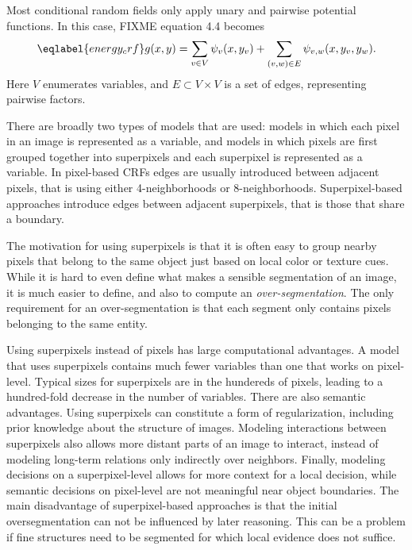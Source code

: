 Most conditional random fields only apply unary and pairwise potential functions. In this case, FIXME equation 4.4
becomes
\begin{equation}\eqlabel{energy_crf}
    g(x, y) = \sum_{v \in V} \psi_v(x, y_v) + \sum_{(v, w) \in E} \psi_{v,w}(x, y_{v}, y_{w}).
\end{equation}
Here $V$ enumerates variables, and $E\subset V \times V$ is a set of edges,
representing pairwise factors.

There are broadly two types of models that are used: models in which each pixel
in an image is represented as a variable, and models in which pixels are first
grouped together into superpixels and each superpixel is represented as a variable.
In pixel-based CRFs edges are usually introduced between adjacent pixels, that is using
either 4-neighborhoods or 8-neighborhoods. Superpixel-based approaches introduce
edges between adjacent superpixels, that is those that share a boundary.

The motivation for using superpixels is that it is often easy to group nearby
pixels that belong to the same object just based on local color or texture cues.
While it is hard to even define what makes a sensible segmentation of an image,
it is much easier to define, and also to compute an \emph{over-segmentation}.
The only requirement for an over-segmentation is that each segment only
contains pixels belonging to the same entity.

Using superpixels instead of pixels has large computational advantages.  A
model that uses superpixels contains much fewer variables than one that works
on pixel-level.  Typical sizes for superpixels are in the hundereds of pixels,
leading to a hundred-fold decrease in the number of variables. There are also
semantic advantages. Using superpixels can constitute a form of regularization,
including prior knowledge about the structure of images. Modeling interactions
between superpixels also allows more distant parts of an image to interact,
instead of modeling long-term relations only indirectly over neighbors.
Finally, modeling decisions on a superpixel-level allows for more context for a
local decision, while semantic decisions on pixel-level are not meaningful near
object boundaries.  The main disadvantage of superpixel-based approaches is
that the initial oversegmentation can not be influenced by later reasoning.
This can be a problem if fine structures need to be segmented for which local
evidence does not suffice.

